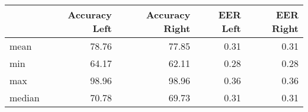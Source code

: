 \begin{tabular}{lrrrr}
\toprule
{} &  Accuracy Left &  Accuracy Right &  EER Left &  EER Right \\
\midrule
mean   &          78.76 &           77.85 &      0.31 &       0.31 \\
min    &          64.17 &           62.11 &      0.28 &       0.28 \\
max    &          98.96 &           98.96 &      0.36 &       0.36 \\
median &          70.78 &           69.73 &      0.31 &       0.31 \\
\bottomrule
\end{tabular}
